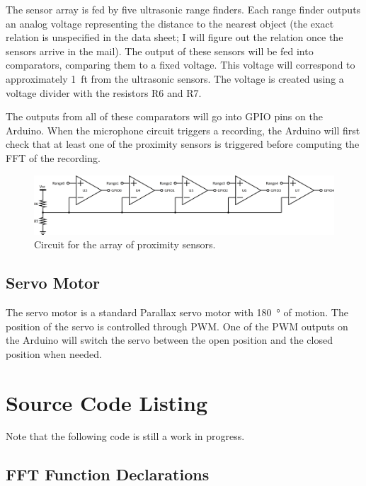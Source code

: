 \documentclass[11pt]{article}
\begin{document}
The sensor array is fed by five ultrasonic range finders. Each range finder
outputs an analog voltage representing the distance to the nearest object (the
exact relation is unspecified in the data sheet; I will figure out the relation
once the sensors arrive in the mail). The output of these sensors will be fed
into comparators, comparing them to a fixed voltage. This voltage will
correspond to approximately \SI{1}{ft} from the ultrasonic sensors. The voltage
is created using a voltage divider with the resistors R6 and R7.

The outputs from all of these comparators will go into GPIO pins on the Arduino.
When the microphone circuit triggers a recording, the Arduino will first check
that at least one of the proximity sensors is triggered before computing the
FFT of the recording.

\begin{figure}[h]
    \centering
    \includegraphics[width=1.0\linewidth]{sch/rangefinders.png}
    \caption{Circuit for the array of proximity sensors.}
\label{fig:rangefinders}
\end{figure}

\subsection{Servo Motor}
\label{sub:servo_motor}

The servo motor is a standard Parallax servo motor with \SI{180}{\degree} of
motion. The position of the servo is controlled through PWM\@. One of the PWM
outputs on the Arduino will switch the servo between the open position and the
closed position when needed.

\section{Source Code Listing}
\label{sec:source_code_listing}

Note that the following code is still a work in progress.

\subsection{FFT Function Declarations}
\label{sub:fft_function_declarations}
\end{document}

